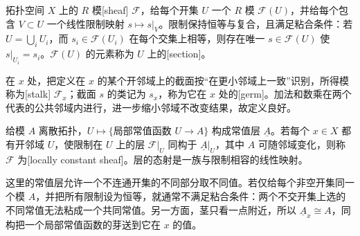 \begin{definition}[局部常值层]\label{g2:def:locally-constant-sheaf}
	拓扑空间 \(X\) 上的 \(R\) 模[sheaf] \(\mathscr F\)，给每个开集 \(U\) 一个 \(R\) 模 \(\mathscr F(U)\)，并给每个包含 \(V\subset U\) 一个线性限制映射 \(s\mapsto s|_V\)。限制保持恒等与复合，且满足粘合条件：若 \(U=\bigcup_iU_i\)，而 \(s_i\in\mathscr F(U_i)\) 在每个交集上相等，则存在唯一 \(s\in\mathscr F(U)\) 使 \(s|_{U_i}=s_i\)。\(\mathscr F(U)\) 的元素称为 \(U\) 上的[section]。

	在 \(x\) 处，把定义在 \(x\) 的某个开邻域上的截面按“在更小邻域上一致”识别，所得模称为[stalk] \(\mathscr F_x\)；截面 \(s\) 的类记为 \(s_x\)，称为它在 \(x\) 处的[germ]。加法和数乘在两个代表的公共邻域内进行，进一步缩小邻域不改变结果，故定义良好。

	给模 \(A\) 离散拓扑，\(U\mapsto\{\text{局部常值函数 }U\to A\}\) 构成常值层 \(\underline A\)。若每个 \(x\in X\) 都有开邻域 \(U\)，使限制在 \(U\) 上的层 \(\mathscr F|_U\) 同构于 \(\underline A|_U\)，其中 \(A\) 可随邻域变化，则称 \(\mathscr F\) 为[locally constant sheaf]。层的态射是一族与限制相容的线性映射。
\end{definition}

这里的常值层允许一个不连通开集的不同部分取不同值。若仅给每个非空开集同一个模 \(A\)，并把所有限制设为恒等，就通常不满足粘合条件：两个不交开集上选的不同常值无法粘成一个共同常值。另一方面，茎只看一点附近，所以 \(\underline A_x\cong A\)，同构把一个局部常值函数的芽送到它在 \(x\) 的值。

